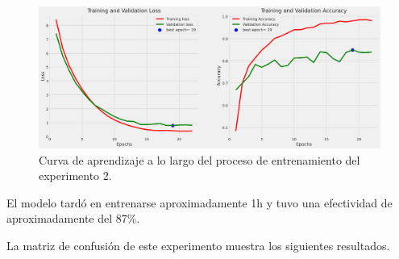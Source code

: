 \begin{figure}[H]
    \begin{center}
        \includegraphics[width=1\textwidth]{./Graphics/training&validation_p3.png}
        \caption{Curva de aprendizaje a lo largo del proceso de entrenamiento del experimento 2.\label{fig:training_validation_loss_p2}}
    \end{center}
\end{figure}

El modelo tardó en entrenarse aproximadamente 1h y tuvo una efectividad de aproximadamente del 87\%.

La matriz de confusión de este experimento muestra los siguientes resultados.

